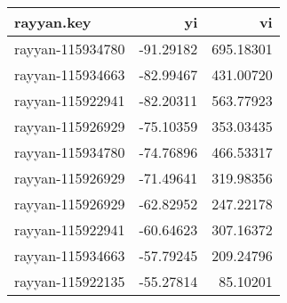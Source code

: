 \documentclass[
]{article}
\begin{document}
\begin{longtable}[]{@{}lrr@{}}
\toprule()
rayyan.key & yi & vi \\
\midrule()
\endhead
rayyan-115934780 & -91.29182 & 695.18301 \\
rayyan-115934663 & -82.99467 & 431.00720 \\
rayyan-115922941 & -82.20311 & 563.77923 \\
rayyan-115926929 & -75.10359 & 353.03435 \\
rayyan-115934780 & -74.76896 & 466.53317 \\
rayyan-115926929 & -71.49641 & 319.98356 \\
rayyan-115926929 & -62.82952 & 247.22178 \\
rayyan-115922941 & -60.64623 & 307.16372 \\
rayyan-115934663 & -57.79245 & 209.24796 \\
rayyan-115922135 & -55.27814 & 85.10201 \\
\bottomrule()
\end{longtable}
\end{document}
